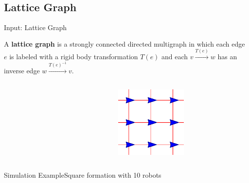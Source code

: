 \documentclass[10pt]{beamer}
\newcommand{\edge}[3]{{#1}\overset{#2}{\longrightarrow}{#3}}
\begin{document}
\subsection{Lattice Graph}
\begin{frame}{Input: Lattice Graph}
  \begin{definition}
    A \textbf{lattice graph} is a strongly connected directed
      multigraph in which each edge $e$ is labeled with a rigid body
      transformation $T(e)$ and each $\edge{v}{T(e)}{w}$ has an
      inverse edge $\edge{w}{T(e)^{-1}}{v}$.  
    \end{definition}
    \begin{columns}[T] %
      \begin{column}{.45\textwidth}
        \begin{figure}
          \centering
        \end{figure}
      \end{column}%
      \begin{column}{.45\textwidth}
        \begin{figure}
          \centering
          \includegraphics[scale=1]{figs/squarelattice}
        \end{figure}
      \end{column}%
    \end{columns}
\end{frame}
\begin{frame}{Simulation Example}{Square formation with 10 robots}
  \begin{center}
  \end{center}
\end{frame}
\end{document}
